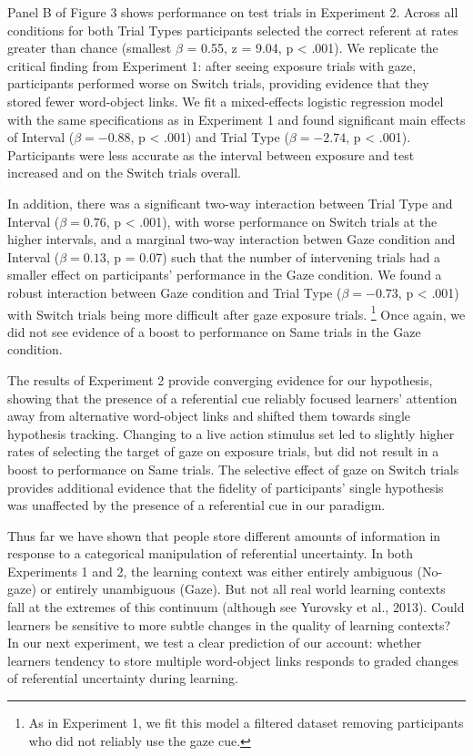 \documentclass[authoryear, review]{elsarticle}
\begin{document}
Panel B of Figure 3 shows performance on test trials in Experiment 2.
Across all conditions for both Trial Types participants selected the
correct referent at rates greater than chance (smallest \(\beta\) =
0.55, z = 9.04, p \textless{} .001). We replicate the critical finding
from Experiment 1: after seeing exposure trials with gaze, participants
performed worse on Switch trials, providing evidence that they stored
fewer word-object links. We fit a mixed-effects logistic regression
model with the same specifications as in Experiment 1 and found
significant main effects of Interval (\(\beta = -0.88\), p \textless{}
.001) and Trial Type (\(\beta = -2.74\), p \textless{} .001).
Participants were less accurate as the interval between exposure and
test increased and on the Switch trials overall.

In addition, there was a significant two-way interaction between Trial
Type and Interval (\(\beta = 0.76\), p \textless{} .001), with worse
performance on Switch trials at the higher intervals, and a marginal
two-way interaction betwen Gaze condition and Interval
(\(\beta = 0.13\), p = 0.07) such that the number of intervening trials
had a smaller effect on participants' performance in the Gaze condition.
We found a robust interaction between Gaze condition and Trial Type
(\(\beta = -0.73\), p \textless{} .001) with Switch trials being more
difficult after gaze exposure trials.
\footnote{As in Experiment 1, we fit this model a filtered dataset removing participants who did not reliably use the gaze cue.}
Once again, we did not see evidence of a boost to performance on Same
trials in the Gaze condition.

The results of Experiment 2 provide converging evidence for our
hypothesis, showing that the presence of a referential cue reliably
focused learners' attention away from alternative word-object links and
shifted them towards single hypothesis tracking. Changing to a live
action stimulus set led to slightly higher rates of selecting the target
of gaze on exposure trials, but did not result in a boost to performance
on Same trials. The selective effect of gaze on Switch trials provides
additional evidence that the fidelity of participants' single hypothesis
was unaffected by the presence of a referential cue in our paradigm.

Thus far we have shown that people store different amounts of
information in response to a categorical manipulation of referential
uncertainty. In both Experiments 1 and 2, the learning context was
either entirely ambiguous (No-gaze) or entirely unambiguous (Gaze). But
not all real world learning contexts fall at the extremes of this
continuum (although see Yurovsky et al., 2013). Could learners be
sensitive to more subtle changes in the quality of learning contexts? In
our next experiment, we test a clear prediction of our account: whether
learners tendency to store multiple word-object links responds to graded
changes of referential uncertainty during learning.
\end{document}
